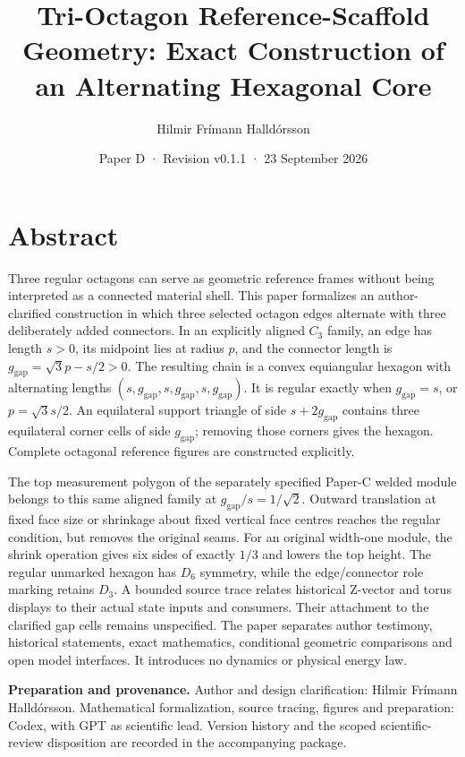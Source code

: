 \documentclass[
  11pt,
  a4paper,
]{article}
\title{Tri-Octagon Reference-Scaffold Geometry: Exact Construction of an Alternating Hexagonal Core}
\author{Hilmir Frímann Halldórsson}
\date{Paper D · Revision v0.1.1 · 23 September 2026}
\begin{document}
\maketitle

\section{Abstract}\label{abstract}

Three regular octagons can serve as geometric reference frames without being interpreted as a connected material shell. This paper formalizes an author-clarified construction in which three selected octagon edges alternate with three deliberately added connectors. In an explicitly aligned \(C_3\) family, an edge has length \(s>0\), its midpoint lies at radius \(p\), and the connector length is \(g_{\mathrm{gap}}=\sqrt3p-s/2>0\). The resulting chain is a convex equiangular hexagon with alternating lengths \((s,g_{\mathrm{gap}},s,g_{\mathrm{gap}},s,g_{\mathrm{gap}})\). It is regular exactly when \(g_{\mathrm{gap}}=s\), or \(p=\sqrt3s/2\). An equilateral support triangle of side \(s+2g_{\mathrm{gap}}\) contains three equilateral corner cells of side \(g_{\mathrm{gap}}\); removing those corners gives the hexagon. Complete octagonal reference figures are constructed explicitly.

The top measurement polygon of the separately specified Paper-C welded module belongs to this same aligned family at \(g_{\mathrm{gap}}/s=1/\sqrt2\). Outward translation at fixed face size or shrinkage about fixed vertical face centres reaches the regular condition, but removes the original seams. For an original width-one module, the shrink operation gives six sides of exactly \(1/3\) and lowers the top height. The regular unmarked hexagon has \(D_6\) symmetry, while the edge/connector role marking retains \(D_3\). A bounded source trace relates historical Z-vector and torus displays to their actual state inputs and consumers. Their attachment to the clarified gap cells remains unspecified. The paper separates author testimony, historical statements, exact mathematics, conditional geometric comparisons and open model interfaces. It introduces no dynamics or physical energy law.

\textbf{Preparation and provenance.} Author and design clarification: Hilmir Frímann Halldórsson. Mathematical formalization, source tracing, figures and preparation: Codex, with GPT as scientific lead. Version history and the scoped scientific-review disposition are recorded in the accompanying package.
\end{document}
